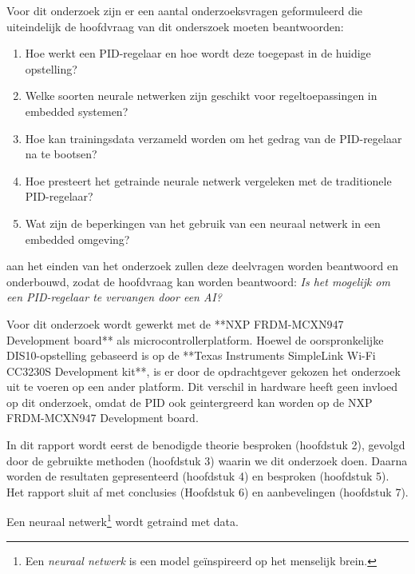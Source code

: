 Voor dit onderzoek zijn er een aantal onderzoeksvragen geformuleerd die uiteindelijk de hoofdvraag van dit onderszoek moeten beantwoorden:
\begin{enumerate}
  \item Hoe werkt een PID-regelaar en hoe wordt deze toegepast in de huidige opstelling?
  \item Welke soorten neurale netwerken zijn geschikt voor regeltoepassingen in embedded systemen?
  \item Hoe kan trainingsdata verzameld worden om het gedrag van de PID-regelaar na te bootsen?
  \item Hoe presteert het getrainde neurale netwerk vergeleken met de traditionele PID-regelaar?
  \item Wat zijn de beperkingen van het gebruik van een neuraal netwerk in een embedded omgeving?
\end{enumerate}

aan het einden van het onderzoek zullen deze deelvragen worden beantwoord en onderbouwd, zodat de hoofdvraag kan worden beantwoord: \textit{Is het mogelijk om een PID-regelaar te vervangen door een AI?}

Voor dit onderzoek wordt gewerkt met de **NXP FRDM-MCXN947 Development board** als microcontrollerplatform. Hoewel de oorspronkelijke DIS10-opstelling gebaseerd is op de **Texas Instruments SimpleLink Wi-Fi CC3230S Development kit**, is er door de opdrachtgever gekozen het onderzoek uit te voeren op een ander platform. Dit verschil in hardware heeft geen invloed op dit onderzoek, omdat de PID ook geintergreerd kan worden op de NXP FRDM-MCXN947 Development board.


In dit rapport wordt eerst de benodigde theorie besproken (hoofdstuk 2), gevolgd door de gebruikte methoden (hoofdstuk 3) waarin we dit onderzoek doen. Daarna worden de resultaten gepresenteerd (hoofdstuk 4) en besproken (hoofdstuk 5). Het rapport sluit af met conclusies (Hoofdstuk 6) en aanbevelingen (hoofdstuk 7).

Een neuraal netwerk\footnote{Een \textit{neuraal netwerk} is een model geïnspireerd op het menselijk brein.} wordt getraind met data.


